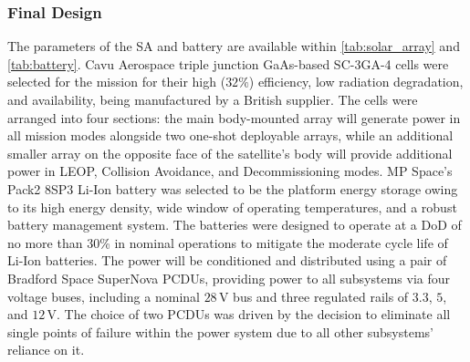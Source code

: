 \documentclass[a4paper, 11pt, conference]{IEEEtran}
\begin{document}
\subsubsection{Final Design}
The parameters of the SA and battery are available within \autoref{tab:solar_array} and \autoref{tab:battery}. Cavu Aerospace triple junction GaAs-based SC-3GA-4 cells were selected for the mission for their high ($32\%$) efficiency, low radiation degradation, and availability, being manufactured by a British supplier. The cells were arranged into four sections: the main body-mounted array will generate power in all mission modes alongside two one-shot deployable arrays, while an additional smaller array on the opposite face of the satellite’s body will provide additional power in LEOP, Collision Avoidance, and Decommissioning modes. MP Space’s Pack2 8SP3 Li-Ion battery was selected to be the platform energy storage owing to its high energy density, wide window of operating temperatures, and a robust battery management system. The batteries were designed to operate at a DoD of no more than 30\% in nominal operations to mitigate the moderate cycle life of Li-Ion batteries. The power will be conditioned and distributed using a pair of Bradford Space SuperNova PCDUs, providing power to all subsystems via four voltage buses, including a nominal $28\,\mathrm{V}$ bus and three regulated rails of $3.3$, $5$, and $12\,\mathrm{V}$. The choice of two PCDUs was driven by the decision to eliminate all single points of failure within the power system due to all other subsystems’ reliance on it.
\end{document}
